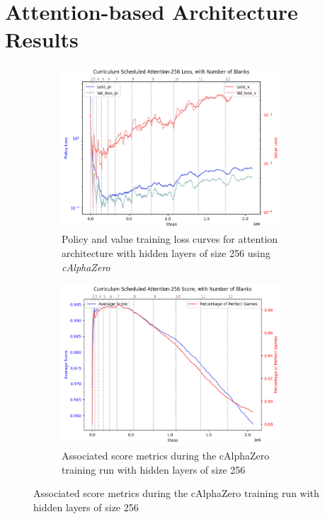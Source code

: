 \documentclass[10pt, reqno, letterpaper, twoside]{amsart}
\begin{document}
\clearpage
\printbibliography

\newpage
\appendix
\section{Attention-based Architecture Results}

\begin{figure}[ht]
    \centering
    \begin{subfigure}[b]{0.45\textwidth}
        \centering
        \includegraphics[width=0.9\textwidth]{images/Curriculum Scheduled Attention-256 Loss.png}
        \caption{Policy and value training loss curves for attention architecture with hidden layers of size 256 using \textit{cAlphaZero}}
        \label{fig:attention-256-loss}
    \end{subfigure}
    \hfill
    \begin{subfigure}[b]{0.45\textwidth}
        \centering
        \includegraphics[width=0.9\textwidth]{images/Curriculum Scheduled Attention-256 Score.png}
        \caption{Associated score metrics during the cAlphaZero training run with hidden layers of size 256}
        \label{fig:attention-256-score}
    \end{subfigure}
    

\end{figure}
\end{document}
